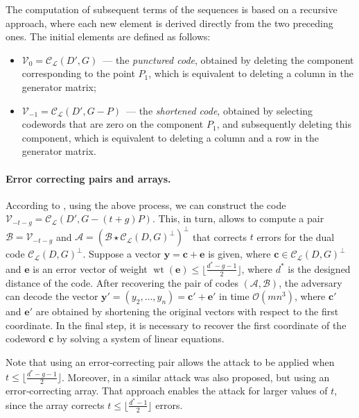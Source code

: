 \documentclass[sn-mathphys-num]{sn-jnl_modified}
\newcommand{\cC}{\ensuremath{\mathcal{C}}}
\begin{document}
The computation of subsequent terms of the sequences is based on a recursive approach, where each new element is derived directly from the two preceding ones. The initial elements are defined as follows:

\begin{itemize}
    \item $\mathcal{V}_0 = \mathcal{C}_\mathscr{L}(D', G)$~--- the \emph{punctured code}, obtained by
    deleting the component corresponding to the point $P_1$, which is equivalent to deleting a column in the generator matrix;
    \item $\mathcal{V}_{-1} = \mathcal{C}_\mathscr{L}(D', G - P)$~--- the \emph{shortened code}, obtained by selecting codewords that are zero on the component $P_1$, 
    and subsequently deleting this component, which is equivalent to deleting a column and a row in the generator matrix.
\end{itemize}


\paragraph{Error correcting pairs and arrays.}

According to \cite{CMP17}, using the above process, we can construct the code $\mathcal{V}_{-t-g}=\cC_\mathscr{L}(D',G-(t+g)P)$. This, in turn, allows to compute a pair $\mathcal{B}=\mathcal{V}_{-t-g}$ and $\mathcal{A}=(\mathcal{B} \star \cC_\mathscr{L}(D, G)^\bot )^\bot$ that corrects $t$ errors for the dual code $\mathcal{C}_\mathscr{L}(D, G)^\perp$. Suppose a vector $\mathbf{y} = \mathbf{c} + \mathbf{e}$ is given, where $\mathbf{c} \in \cC_\mathscr{L}(D, G)^\bot$ and $\mathbf{e}$ is an error vector of weight $\operatorname{wt}(\mathbf{e}) \leq \lfloor\frac{d^*-g-1}{2}\rfloor$, where $d^*$ is the designed distance of the code. After recovering the pair of codes $(\mathcal{A}, \mathcal{B})$, the adversary can decode the vector $\mathbf{y}'=(y_2,\dots,y_n) = \mathbf{c}' + \mathbf{e}'$ in time $\mathcal{O}(mn^3)$, where $\mathbf{c}'$ and $\mathbf{e}'$ are obtained by shortening the original vectors with respect to the first coordinate. In the final step, it is necessary to recover the first coordinate of the codeword $\mathbf{c}$ by solving a system of linear equations. 

Note that using an error‑correcting pair allows the attack to be applied when $t\leq \lfloor\frac{d^*-g-1}{2}\rfloor$. Moreover, in \cite{CMP17} a similar attack was also proposed, but using an error‑correcting array. That approach enables the attack for larger values of $t$, since the array corrects $t\leq \lfloor\frac{d^*-1}{2}\rfloor$ errors.
\end{document}
